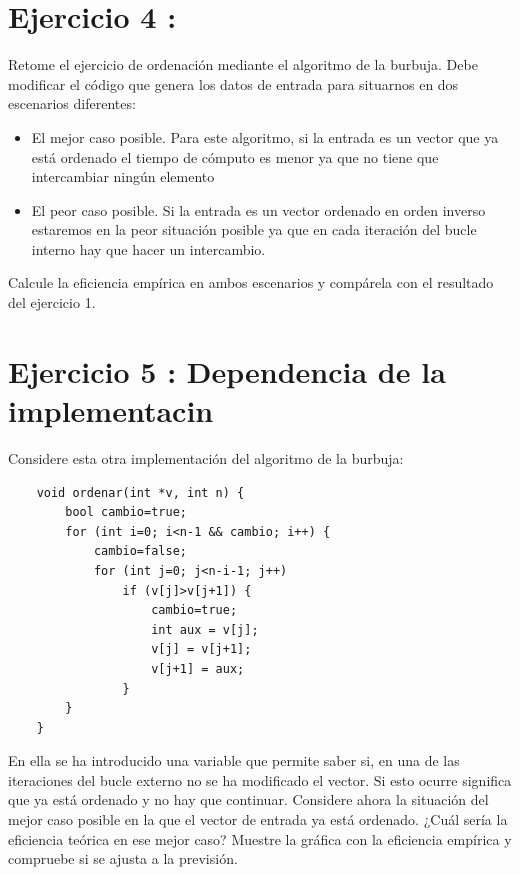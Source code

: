 \documentclass{article}
\begin{document}
\clearpage
\section{Ejercicio 4 :}
Retome el ejercicio de ordenación mediante el algoritmo de la burbuja. Debe modificar el
código que genera los datos de entrada para situarnos en dos escenarios diferentes:
\begin{itemize}
	\item El mejor caso posible. Para este algoritmo, si la entrada es un vector que ya está ordenado el tiempo de cómputo es menor ya que no tiene que intercambiar ningún elemento
	\item El peor caso posible. Si la entrada es un vector ordenado en orden inverso estaremos en la peor situación posible ya que en cada iteración del bucle interno hay que hacer un intercambio.
\end{itemize}
	Calcule la eficiencia empírica en ambos escenarios y compárela con el resultado del ejercicio 1.
\clearpage
\section{Ejercicio 5 : Dependencia de la implementacin}
Considere esta otra implementación del algoritmo de la burbuja:
\begin{lstlisting}
	void ordenar(int *v, int n) {
		bool cambio=true;
		for (int i=0; i<n-1 && cambio; i++) {
			cambio=false;
			for (int j=0; j<n-i-1; j++)
				if (v[j]>v[j+1]) {
					cambio=true;
					int aux = v[j];
					v[j] = v[j+1];
					v[j+1] = aux;
				}
		}
	}
\end{lstlisting}

En ella se ha introducido una variable que permite saber si, en una de las iteraciones del
bucle externo no se ha modificado el vector. Si esto ocurre significa que ya está ordenado
y no hay que continuar.
Considere ahora la situación del mejor caso posible en la que el vector de entrada ya está
ordenado. ¿Cuál sería la eficiencia teórica en ese mejor caso? Muestre la gráfica con la
eficiencia empírica y compruebe si se ajusta a la previsión.
\end{document}
